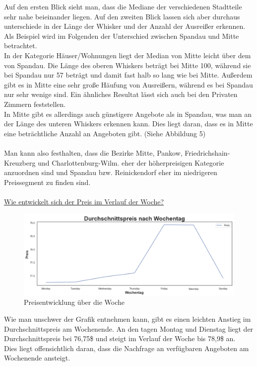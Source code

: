 \documentclass[12pt]{article}
\begin{document}
\begin{text}
Auf den ersten Blick sieht man, dass die Mediane der verschiedenen Stadtteile sehr nahe beieinander liegen. Auf den zweiten Blick lassen sich aber durchaus unterschiede in der Länge der Whisker und der Anzahl der Ausreißer erkennen. Als Beispiel wird im Folgenden der Unterschied zwischen Spandau und Mitte betrachtet.
\\
In der Kategorie Häuser/Wohnungen liegt der Median von Mitte leicht über dem von Spandau. Die Länge des oberen Whiskers beträgt bei Mitte 100, während sie bei Spandau nur 57 beträgt und damit fast halb so lang wie bei Mitte. Außerdem gibt es in Mitte eine sehr große Häufung von Ausreißern, während es bei Spandau nur sehr wenige sind. Ein ähnliches Resultat lässt sich auch bei den Privaten Zimmern feststellen.
\\
In Mitte gibt es allerdings auch günstigere Angebote als in Spandau, was man an der Länge des unteren Whiskers erkennen kann. Dies liegt daran, dass es in Mitte eine beträchtliche Anzahl an Angeboten gibt. (Siehe Abbildung 5)
\\\\
Man kann also festhalten, dass die Bezirke Mitte, Pankow, Friedrichshain-Kreuzberg und Charlottenburg-Wilm. eher der höherpreisigen Kategorie anzuordnen sind und Spandau bzw. Reinickendorf eher im niedrigeren Preissegment zu finden sind.
\\\\
\underline{Wie entwickelt sich der Preis im Verlauf der Woche?}

\begin{figure}[h]
 \includegraphics[width=1.1\textwidth]{WochePreisBild.PNG}
 \caption{Preisentwicklung über die Woche}
\end{figure}

Wie man unschwer der Grafik entnehmen kann, gibt es einen leichten Anstieg im Durchschnittspreis am Wochenende. An den tagen Montag und Dienstag liegt der Durchschnittspreis bei 76,75\$ und steigt im Verlauf der Woche bis 78,9\$ an. 
\\
Dies liegt offensichtlich daran, dass die Nachfrage an verfügbaren Angeboten am Wochenende ansteigt.


\end{text}
\end{document}
